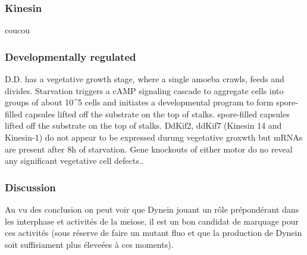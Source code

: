 \documentclass[twocolumn,10pt]{article} %
\begin{document}
\subsubsection*{Kinesin}
coucou
\subsubsection*{Developmentally regulated}
D.D. has a vegetative growth stage, where a single amoeba crawls, feeds and divides. Starvation triggers a cAMP signaling cascade to aggregate cells into groups of about 10\^{}5 cells and initiates a developmental program to form spore-filled capsules lifted off the substrate on the top of stalks.
spore-filled capsules lifted off the substrate on the top of stalks.
DdKif2, ddKif7 (Kinesin 14 and Kinesin-1) do not appear to be expressed durung vegetative groxwth but mRNAs are present after 8h of starvation. 
Gene knockouts of either motor do no reveal any significant vegetative cell defects.\cite{deHostos_1998}.

\subsubsection*{Discussion}
Au vu des conclusion on peut voir que Dynein jouant un rôle prépondérant dans les interphase et activités de la meiose,
 il est un bon candidat de marquage pour ces activités (sous réserve de faire un mutant fluo et que la production de 
 Dynein soit suffisiament plus éleveées à ces moments).

\end{document}

